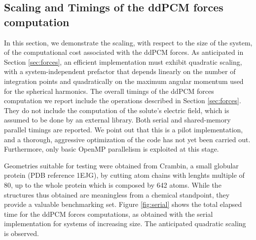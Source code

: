 \documentclass[aip,jcp,a4paper,11pt]{revtex4-1}
\begin{document}
% 





\subsection{Scaling and Timings of the ddPCM forces computation}
In this section, we demonstrate the scaling, with respect to the size of the system, of the computational cost associated with the ddPCM forces. As anticipated in Section \ref{sec:forces}, an efficient implementation must exhibit quadratic scaling, \color{red}with a system-independent prefactor that depends linearly on the number of integration points and quadratically on the maximum angular momentum used for the spherical harmonics\color{black}. The overall timings of the ddPCM forces computation we report include the operations described in Section \ref{sec:forces}. They do not include the computation of the solute's electric field, which is assumed to be done by an external library. Both serial and shared-memory parallel timings are reported. We point out that this is a pilot implementation, and a thorough, aggressive optimization of the code has not yet been carried out. Furthermore, only basic OpenMP parallelism is exploited at this stage.

Geometries suitable for testing were obtained from Crambin, a small globular protein (PDB reference 1EJG), by cutting atom chains with lenghts multiple of 80, up to the whole protein which is composed by 642 atoms. While the structures thus obtained are meaningless from a chemical standpoint, they provide a valuable benchmarking set. Figure \ref{fig:serial} shows the total elapsed time for the ddPCM forces computations, as obtained with the serial implementation for systems of increasing size. The anticipated quadratic scaling is observed.
\end{document}
